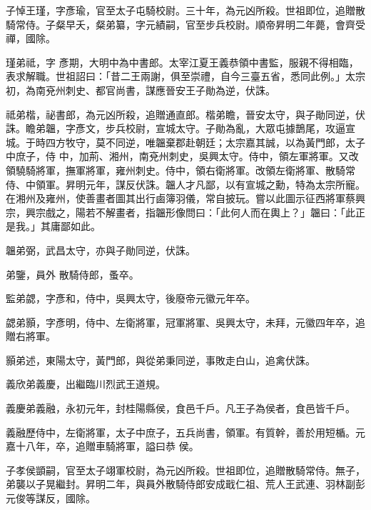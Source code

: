 \begin{pinyinscope}
 子悼王瑾，字彥瑜，官至太子屯騎校尉。三十年，為元凶所殺。世祖即位，追贈散騎常侍。子粲早夭，粲弟纂，字元績嗣，官至步兵校尉。順帝昇明二年薨，會齊受禪，國除。



 瑾弟祗，字
 彥期，大明中為中書郎。太宰江夏王義恭領中書監，服親不得相臨，表求解職。世祖詔曰：「昔二王兩謝，俱至崇禮，自今三臺五省，悉同此例。」太宗初，為南兗州刺史、都官尚書，謀應晉安王子勛為逆，伏誅。



 祗弟楷，祕書郎，為元凶所殺，追贈通直郎。楷弟瞻，晉安太守，與子勛同逆，伏誅。瞻弟韞，字彥文，步兵校尉，宣城太守。子勛為亂，大眾屯據鵲尾，攻逼宣城。于時四方牧守，莫不同逆，唯韞棄郡赴朝廷；太宗嘉其誠，以為黃門郎，太子中庶子，侍
 中，加荊、湘州，南兗州刺史，吳興太守。侍中，領左軍將軍。又改領驍騎將軍，撫軍將軍，雍州刺史。侍中，領右衛將軍。改領左衛將軍、散騎常侍、中領軍。昇明元年，謀反伏誅。韞人才凡鄙，以有宣城之勳，特為太宗所寵。在湘州及雍州，使善畫者圖其出行鹵簿羽儀，常自披玩。嘗以此圖示征西將軍蔡興宗，興宗戲之，陽若不解畫者，指韞形像問曰：「此何人而在輿上？」韞曰：「此正是我。」其庸鄙如此。



 韞弟弼，武昌太守，亦與子勛同逆，伏誅。



 弟鑒，員外
 散騎侍郎，蚤卒。



 監弟勰，字彥和，侍中，吳興太守，後廢帝元徽元年卒。



 勰弟顥，字彥明，侍中、左衛將軍，冠軍將軍、吳興太守，未拜，元徽四年卒，追贈右將軍。



 顥弟述，東陽太守，黃門郎，與從弟秉同逆，事敗走白山，追禽伏誅。



 義欣弟義慶，出繼臨川烈武王道規。



 義慶弟義融，永初元年，封桂陽縣侯，食邑千戶。凡王子為侯者，食邑皆千戶。



 義融歷侍中，左衛將軍，太子中庶子，五兵尚書，領軍。有質幹，善於用短楯。元嘉十八年，卒，追贈車騎將軍，謚曰恭
 侯。



 子孝侯顗嗣，官至太子翊軍校尉，為元凶所殺。世祖即位，追贈散騎常侍。無子，弟襲以子晃繼封。昇明二年，與員外散騎侍郎安成戢仁祖、荒人王武連、羽林副彭元俊等謀反，國除。




\end{pinyinscope}
